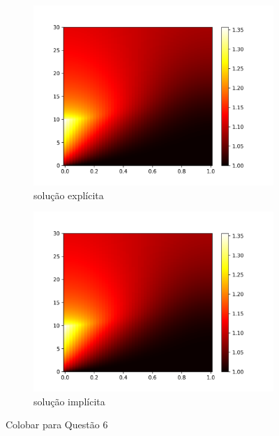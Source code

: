 \documentclass{article}
\begin{document}
\begin{figure}[h]
\centering
     \begin{subfigure}[b]{0.49\textwidth}
         \centering
         \includegraphics[width=\textwidth]{figs/q6a_colormap.png}
         \caption{ solução explícita}
	\label{fig:q6a_colobar}
     \end{subfigure}
     \hfill
     \begin{subfigure}[b]{0.49\textwidth}
         \centering
         \includegraphics[width=\textwidth]{figs/q6b_colormap.png}
         \caption{solução implícita}
	\label{fig:q6b_colobar}
     \end{subfigure}
\caption{Colobar para Questão 6}
\end{figure}
\end{document}
